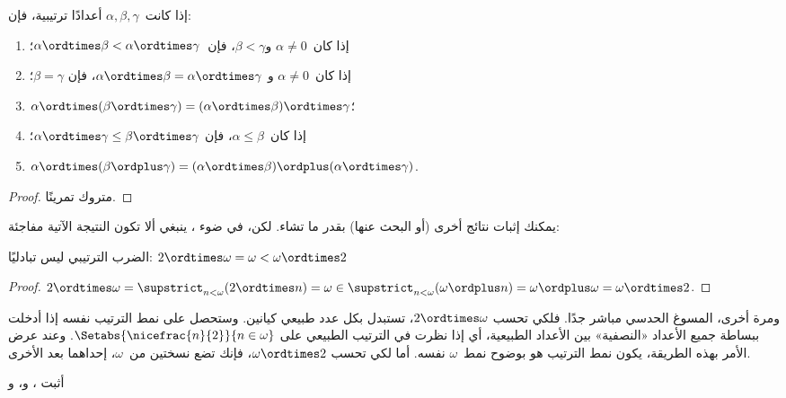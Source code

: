 \documentclass[../../../include/open-logic-section]{subfiles}
\begin{document}
\begin{lem}
إذا كانت~$\alpha, \beta, \gamma$ أعدادًا ترتيبية، فإن:
\begin{enumerate}
	\item{} إذا كان~$\alpha \neq 0$ و$\beta < \gamma$،
	فإن~$\alpha \ordtimes \beta < \alpha \ordtimes \gamma$؛
	\item{} إذا كان~$\alpha \neq 0$ و
	$\alpha \ordtimes \beta = \alpha\ordtimes\gamma$، فإن
	$\beta = \gamma$؛
	\item{} $\alpha \ordtimes (\beta \ordtimes
	\gamma) = (\alpha \ordtimes \beta) \ordtimes \gamma$؛
	\item{} إذا كان~$\alpha \leq \beta$، فإن
	$\alpha \ordtimes \gamma \leq \beta \ordtimes \gamma$؛
	\item{} $\alpha \ordtimes (\beta \ordplus
	\gamma) = (\alpha \ordtimes \beta )\ordplus (\alpha\ordtimes
	\gamma)$.
\end{enumerate}
\end{lem}

\begin{proof}
متروك تمرينًا.
\end{proof}

يمكنك إثبات نتائج أخرى (أو البحث عنها) بقدر ما تشاء. لكن، في ضوء
، ينبغي ألا تكون النتيجة
الآتية مفاجئة:

\begin{prop}
الضرب الترتيبي ليس تبادليًا:
$2 \ordtimes \omega = \omega < \omega \ordtimes 2$
\end{prop}

\begin{proof}
$2 \ordtimes \omega = \supstrict_{n < \omega}(2\ordtimes n) = \omega
\in \supstrict_{n < \omega}(\omega \ordplus n) = \omega \ordplus
\omega = \omega \ordtimes 2$.
\end{proof}
\noindent
ومرة أخرى، المسوغ الحدسي مباشر جدًا. فلكي تحسب
$2 \ordtimes \omega$، تستبدل بكل عدد طبيعي كيانين. وستحصل على نمط
الترتيب نفسه إذا أدخلت ببساطة جميع الأعداد «النصفية» بين الأعداد
الطبيعية، أي إذا نظرت في الترتيب الطبيعي على
$\Setabs{\nicefrac{n}{2}}{n \in \omega}$. وعند عرض الأمر بهذه الطريقة،
يكون نمط الترتيب هو بوضوح نمط~$\omega$ نفسه. أما لكي تحسب
$\omega \ordtimes 2$، فإنك تضع نسختين من~$\omega$، إحداهما بعد
الأخرى.

\begin{prob}
أثبت
،
و،
و
\end{prob}
\end{document}
